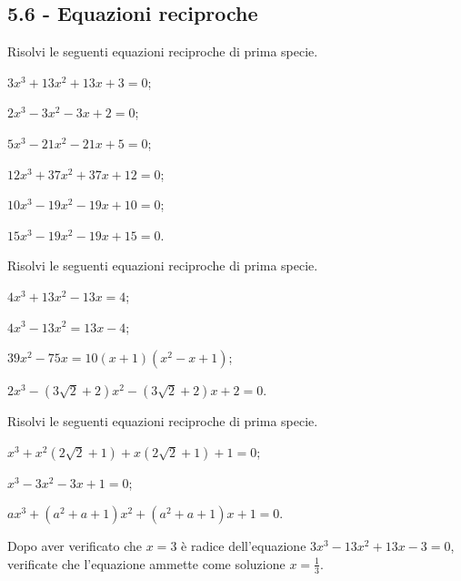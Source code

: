 \subsection*{5.6 - Equazioni reciproche}

\begin{esercizio}[\Ast]
\label{ese:5.36}
Risolvi le seguenti equazioni reciproche di prima specie.
\begin{multicols}{2}
\begin{enumeratea}
\item $3x^3+13x^2+13x+3=0$;
\item $2x^3-3x^2-3x+2=0$;
\item $5x^3-21x^2-21x+5=0$;
\item $12x^3+37x^2+37x+12=0$;
\item $10x^3-19x^2-19x+10=0$;
\item $15x^3-19x^2-19x+15=0$.
\end{enumeratea}
\end{multicols}
\end{esercizio}
\pagebreak

\begin{esercizio}[\Ast]
\label{ese:5.37}
Risolvi le seguenti equazioni reciproche di prima specie.
\begin{multicols}{2}
\begin{enumeratea}
\item $4x^3+13x^2-13x=4$;
\item $4x^3-13x^2=13x-4$;
\item $39x^{2}-75x=10(x+1)(x^2-x+1)$;
\item $2x^3-(3\sqrt 2+2)x^2-(3\sqrt 2+2)x+2=0$.
\end{enumeratea}
\end{multicols}
\end{esercizio}

\begin{esercizio}[\Ast]
\label{ese:5.38}
Risolvi le seguenti equazioni reciproche di prima specie.
\begin{enumeratea}
\item $x^3+x^2(2\sqrt 2+1)+x(2\sqrt 2+1)+1=0$;
\item $x^3-3x^2-3x+1=0$;
\item ${ax}^3+(a^2+a+1)x^2+(a^2+a+1)x+1=0$.
\end{enumeratea}
\end{esercizio}

 \begin{esercizio}
\label{ese:5.39}
Dopo aver verificato che $x=3$ è radice dell'equazione $3x^3-13x^2+13x-3=0$, verificate che l'equazione ammette come soluzione $x=\frac 1 3$.
 \end{esercizio}

